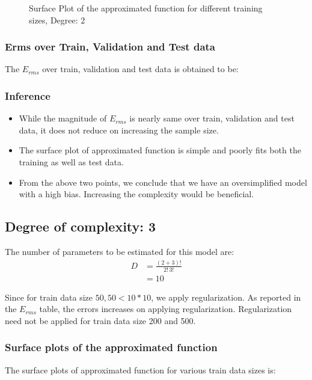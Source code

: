 \documentclass[12pt,a4paper]{article}
\newcommand{\noi}{\noindent}
\begin{document}
\begin{figure}[H]
    \caption{Surface Plot of the approximated function for different training sizes, Degree: 2}
    \label{fig:sp_d2}
\end{figure}

\subsubsection{Erms over Train, Validation and Test data}
The $E_{rms}$ over train, validation and test data is obtained to be: 


\subsubsection{Inference}
\begin{itemize}
    \itemsep0em
    \item While the magnitude of $E_{rms}$ is nearly same over train, validation and test data, it does not reduce on increasing the sample size. 
    \item The surface plot of approximated function is simple and poorly fits both the training as well as test data.
    \item From the above two points, we conclude that we have an oversimplified model with a high bias. Increasing the complexity would be beneficial.
\end{itemize}

\subsection{Degree of complexity: 3}
The number of parameters to be estimated for this model are: 
\begin{equation}
    \begin{split}
        D&=\frac{(2+3)!}{2!\,3!} \\
         &=10
    \end{split}
\end{equation}

\noi
Since for train data size $50, 50<10*10$, we apply regularization. As reported in the $E_{rms}$ table, the errors increases on applying regularization. Regularization need not be applied for train data size 200 and 500. 

\subsubsection{Surface plots of the approximated function}
The surface plots of approximated function for various train data sizes is: 
\end{document}
